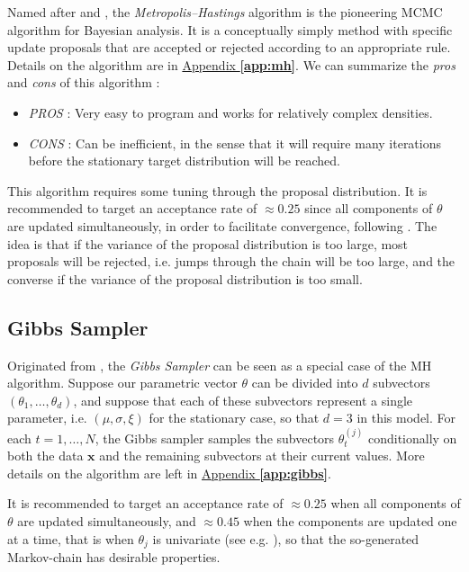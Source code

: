 Named after \citet{metropolis_1953} and  \cite{hastings_monte_1970} , the \emph{Metropolis–Hastings} algorithm is the pioneering MCMC algorithm for Bayesian analysis. It is a conceptually simply method with specific update proposals that are accepted or rejected according to an appropriate rule.
Details on the algorithm are in \hyperref[app:mh]{Appendix \textbf{\ref{app:mh}}}.
We can summarize the \emph{pros} and \emph{cons} of this algorithm :

\begin{itemize}
	\item \emph{PROS} : Very easy to program and works for relatively complex densities.
	\item \emph{CONS} : Can be inefficient, in the sense that it will require many iterations before the stationary target distribution will be reached. 
\end{itemize}
This algorithm requires some tuning through the proposal distribution. 
It is recommended to target an acceptance rate of $\approx 0.25$ since all components of $\theta$ are updated simultaneously, in order to facilitate convergence, following \citet{BEDARD20082198}.
The idea is that if the variance of the proposal distribution is too large, most proposals will be rejected,	i.e. jumps through the chain will be too large, and the converse if the variance of the proposal distribution is too small.


\subsection{Gibbs Sampler}

Originated from \citet{Geman_1984}, the \emph{Gibbs Sampler} can be seen as a special case of the MH algorithm.
Suppose our parametric vector $\theta$ can be divided into $d$ subvectors $(\theta_1,\dots,\theta_d)$, and suppose that each of these subvectors represent a single parameter, i.e. $(\mu,\sigma,\xi)$ for the stationary case, so that $d=3$ in this model.
For each $t=1,\dots,N$, the Gibbs sampler samples the subvectors $\theta_t^{(j)}$ conditionally on both the data $\boldsymbol{x}$ and the remaining subvectors at their current values.
More details on the algorithm are left in \hyperref[app:gibbs]{Appendix \textbf{\ref{app:gibbs}}}.

It is recommended to target an acceptance rate of $\approx 0.25$ when all components of $\theta$ are updated simultaneously, and $\approx 0.45$ when the components are updated one at a time, that is when $\theta_j$ is univariate (see e.g. \citet[chap.11]{gelman_bayesian_2013}), so that the so-generated Markov-chain has desirable properties.

